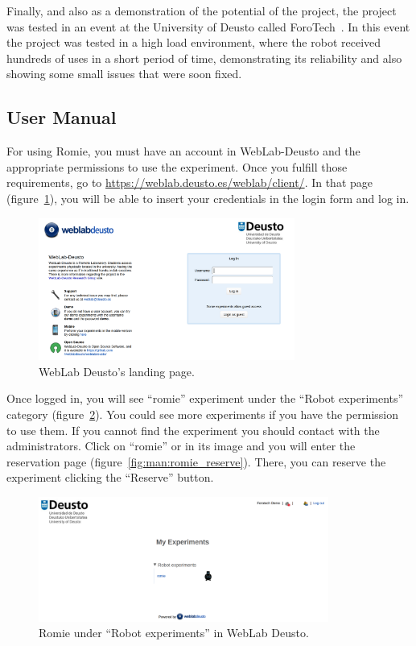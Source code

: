 Finally, and also as a demonstration of the potential of the project, the project was tested in an
event at the University of Deusto called ForoTech~\cite{forotech}. In this event the project was
tested in a high load environment, where the robot received hundreds of uses in a short period of
time, demonstrating its reliability and also showing some small issues that were soon fixed.

\subsection{User Manual}

For using Romie, you must have an account in WebLab-Deusto and the appropriate permissions to use
the experiment. Once you fulfill those requirements, go to
\url{https://weblab.deusto.es/weblab/client/}. In that page (figure~\ref{fig:man:weblab}), you will
be able to insert your credentials in the login form and log in.

\begin{figure}[ht]
	\centering
	\includegraphics[width=0.75\textwidth]{fig/manuals/weblab}
	\caption{WebLab Deusto's landing page.}
	\label{fig:man:weblab}
\end{figure}

Once logged in, you will see ``romie'' experiment under the ``Robot experiments'' category
(figure~\ref{fig:man:romie_weblab}). You could see more experiments if you have the permission to
use them. If you cannot find the experiment you should contact with the administrators. Click on
``romie'' or in its image and you will enter the reservation page
(figure~\ref{fig:man:romie_reserve}). There, you can reserve the experiment clicking the ``Reserve''
button.

\begin{figure}[!htbp]
	\centering
	\includegraphics[width=0.85\textwidth]{fig/manuals/trivial/romie-weblab}
	\caption{Romie under ``Robot experiments'' in WebLab Deusto.}
	\label{fig:man:romie_weblab}
\end{figure}

